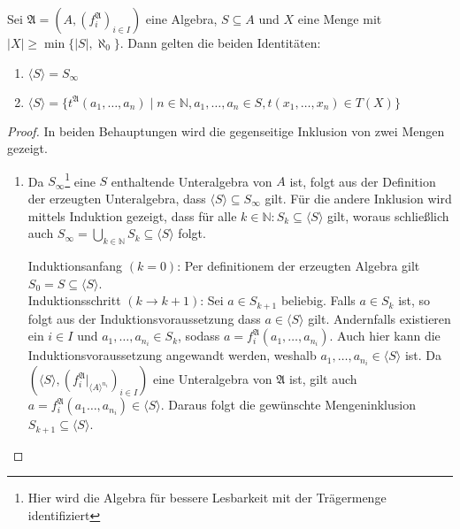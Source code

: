 \begin{proposition}
    Sei $\mathfrak{A}=(A,(f^\mathfrak{A}_i)_{i\in I})$ eine Algebra, $S\subseteq A$ und $X$ eine Menge mit $\vert X \vert \ge \min\{\vert S \vert, \aleph_0\}$. Dann gelten die beiden Identitäten:
    \begin{enumerate}
        \item $\langle S\rangle=S_\infty$
        \item $\langle S\rangle=\{t^\mathfrak{A}(a_1,\ldots,a_n) \mid n \in \mathbb{N}, a_1,\ldots,a_n\in S, t(x_1,\ldots,x_n) \in T(X) \}$
    \end{enumerate}
\end{proposition}
\begin{proof} In beiden Behauptungen wird die gegenseitige Inklusion von zwei Mengen gezeigt.
    \begin{enumerate}
        \item Da $S_\infty$\footnote{Hier wird die Algebra für bessere Lesbarkeit mit der Trägermenge identifiziert} eine $S$ enthaltende Unteralgebra von $A$ ist, folgt aus der Definition der
        erzeugten Unteralgebra, dass $\langle S\rangle\subseteq S_\infty$ gilt.
        Für die andere Inklusion wird mittels Induktion gezeigt, dass für alle $k\in\mathbb{N}:S_k\subseteq \langle S\rangle$ gilt,
        woraus schließlich auch $S_\infty=\bigcup_{k\in\mathbb{N}}S_k\subseteq \langle S\rangle$ folgt.

        Induktionsanfang $(k=0)$: Per definitionem der erzeugten Algebra gilt $S_0=S\subseteq \langle S\rangle$. \\
        Induktionsschritt $(k\to k+1)$: Sei $a\in S_{k+1}$ beliebig. Falls $a\in S_k$ ist, so folgt aus der Induktionsvoraussetzung dass $a\in \langle S\rangle$ gilt. Andernfalls existieren ein $i\in I$ und $a_1,\ldots,a_{n_i}\in S_{k}$, sodass $a=f_i^{\mathfrak{A}}(a_1,\ldots,a_{n_i})$. Auch hier kann die Induktionsvoraussetzung angewandt werden, weshalb $a_1,\ldots,a_{n_i}\in \langle S\rangle$ ist. Da $(\langle S\rangle,(f_i^{\mathfrak{A}}\vert_{\langle A\rangle^{n_i}})_{i\in I})$ eine Unteralgebra von $\mathfrak{A}$ ist, gilt auch $a=f_i^{\mathfrak{A}}(a_1\ldots,a_{n_i})\in\langle S\rangle$. Daraus folgt die gewünschte Mengeninklusion $S_{k+1}\subseteq \langle S\rangle$.


\end{enumerate}
\end{proof}
